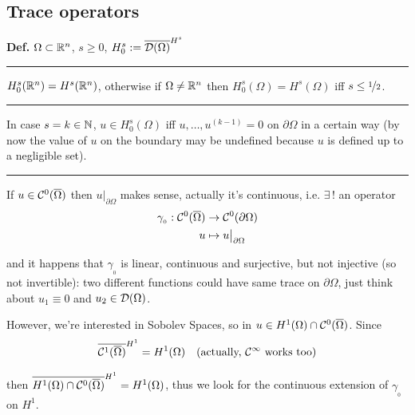 \newpage


\subsection{\color{red}Trace operators}


\textbf{Def.} $\Omega\subset \mathbb{R}^n$, $s\geq 0$, $H_0^s:=\overline{\mathcal{D}(\Omega)}^{H^s}$

\rule{0.31\textwidth}{0.2pt}
\smallskip

$H_0^s(\mathbb{R}^n)=H^s(\mathbb{R}^n)$, otherwise if $\Omega\neq\mathbb{R}^n$ then $H_0^s(\Omega)=H^s(\Omega)$ iff $s\leq\nicefrac{1}{2}$.

\rule{0.31\textwidth}{0.2pt}
\smallskip

In case $s=k\in\mathbb{N}$, $u\in H^s_0(\Omega)$ iff $u,\dots,u^{(k-1)}=0$ on $\partial\Omega$ in a certain way (by now the value of $u$ on the boundary may be undefined because $u$ is defined up to a negligible set).

\rule{0.31\textwidth}{0.2pt}
\smallskip

If $u\in\mathcal{C}^0(\overline{\Omega})$ then $u\big|_{\partial\Omega}$ makes sense, actually it's continuous, i.e. $\exists \,!$ an operator
\begin{align*}
\gamma_{_0}:\mathcal{C}^0(\overline{\Omega})&\to\mathcal{C}^0(\partial\Omega) \\
u&\mapsto u\big|_{\partial\Omega}
\end{align*}

and it happens that $\gamma_{_0}$ is linear, continuous and surjective, but not injective (so not invertible): two different functions could have same trace on $\partial\Omega$, just think about $u_1\equiv0$ and $u_2\in\mathcal{D}(\Omega)$.

\smallskip

However, we're interested in Sobolev Spaces, so in $u\in H^1(\Omega)\cap \mathcal{C}^0(\overline{\Omega})$. Since
\begin{equation*}
\overline{\mathcal{C}^1(\overline{\Omega})}^{H^1}=H^1(\Omega) \quad(\text{actually, }\mathcal{C}^\infty\text{ works too})
\end{equation*}

then $\overline{H^1(\Omega)\cap\mathcal{C}^0(\overline{\Omega})}^{H^1}=H^1(\Omega)$, thus we look for the continuous extension of $\gamma_{_0}$ on $H^1$. 

